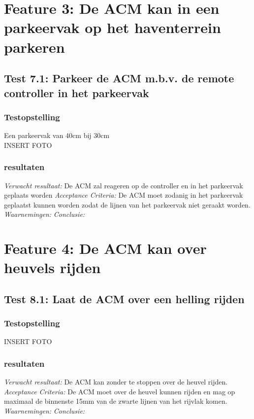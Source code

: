 \documentclass{article}
\begin{document}
\section{Feature 3: De ACM kan in een parkeervak op het haventerrein parkeren}
\subsection{Test 7.1: Parkeer de ACM m.b.v. de remote controller in het parkeervak}
\subsubsection{Testopstelling}
Een parkeervak van 40cm bij 30cm\\
INSERT FOTO
\subsubsection{resultaten}
\textit{Verwacht resultaat: }De ACM zal reageren op de controller en in het parkeervak geplaats worden
\newline
\textit{Acceptance Criteria: }De ACM moet zodanig in het parkeervak geplaatst kunnen worden zodat de lijnen van het parkeervak niet geraakt worden.
\newline
\textit{Waarnemingen: }
\newline
\textit{Conclusie: }

\section{Feature 4: De ACM kan over heuvels rijden}

\subsection{Test 8.1: Laat de ACM over een helling rijden}
\subsubsection{Testopstelling}

INSERT FOTO
\subsubsection{resultaten}
\textit{Verwacht resultaat: }De ACM kan zonder te stoppen over de heuvel rijden.
\newline
\textit{Acceptance Criteria: }De ACM moet over de heuvel kunnen rijden en mag op maximaal de binnenste 15mm van de zwarte lijnen van het rijvlak komen.
\newline
\textit{Waarnemingen: }
\newline
\textit{Conclusie: }
\end{document}

